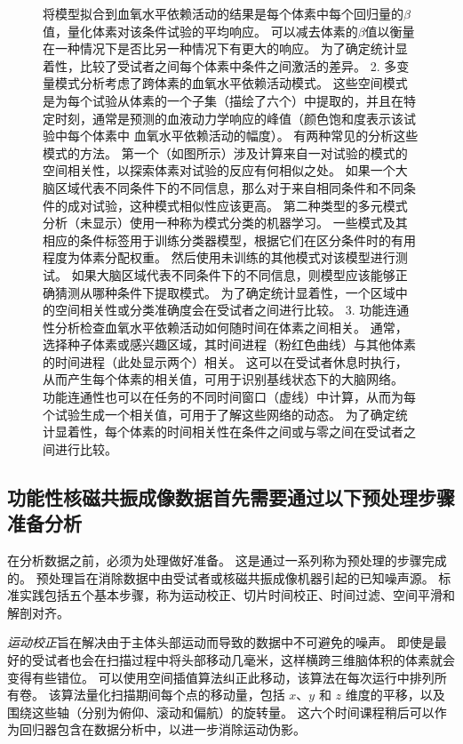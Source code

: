 \begin{figure}[htbp]
{		将模型拟合到血氧水平依赖活动的结果是每个体素中每个回归量的$\beta$值，量化体素对该条件试验的平均响应。 
		可以减去体素的$\beta$值以衡量在一种情况下是否比另一种情况下有更大的响应。
		为了确定统计显着性，比较了受试者之间每个体素中条件之间激活的差异。
		2. 多变量模式分析考虑了跨体素的血氧水平依赖活动模式。
		这些空间模式是为每个试验从体素的一个子集（描绘了六个）中提取的，并且在特定时刻，通常是预测的血液动力学响应的峰值（颜色饱和度表示该试验中每个体素中 血氧水平依赖活动的幅度）。
		有两种常见的分析这些模式的方法。
		第一个（如图所示）涉及计算来自一对试验的模式的空间相关性，以探索体素对试验的反应有何相似之处。
		如果一个大脑区域代表不同条件下的不同信息，那么对于来自相同条件和不同条件的成对试验，这种模式相似性应该更高。
		第二种类型的多元模式分析（未显示）使用一种称为模式分类的机器学习。
		一些模式及其相应的条件标签用于训练分类器模型，根据它们在区分条件时的有用程度为体素分配权重。
		然后使用未训练的其他模式对该模型进行测试。
		如果大脑区域代表不同条件下的不同信息，则模型应该能够正确猜测从哪种条件下提取模式。
		为了确定统计显着性，一个区域中的空间相关性或分类准确度会在受试者之间进行比较。
		3. 功能连通性分析检查血氧水平依赖活动如何随时间在体素之间相关。
		通常，选择种子体素或感兴趣区域，其时间进程（粉红色曲线）与其他体素的时间进程（此处显示两个）相关。
		这可以在受试者休息时执行，从而产生每个体素的相关值，可用于识别基线状态下的大脑网络。
		功能连通性也可以在任务的不同时间窗口（虚线）中计算，从而为每个试验生成一个相关值，可用于了解这些网络的动态。
		为了确定统计显着性，每个体素的时间相关性在条件之间或与零之间在受试者之间进行比较。}
	\label{fig:6_2}
\end{figure}




\subsection{功能性核磁共振成像数据首先需要通过以下预处理步骤准备分析}

在分析数据之前，必须为处理做好准备。 
这是通过一系列称为预处理的步骤完成的。 
预处理旨在消除数据中由受试者或核磁共振成像机器引起的已知噪声源。 
标准实践包括五个基本步骤，称为运动校正、切片时间校正、时间过滤、空间平滑和解剖对齐。


\textit{运动校正}旨在解决由于主体头部运动而导致的数据中不可避免的噪声。
即使是最好的受试者也会在扫描过程中将头部移动几毫米，这样横跨三维脑体积的体素就会变得有些错位。
可以使用空间插值算法纠正此移动，该算法在每次运行中排列所有卷。
该算法量化扫描期间每个点的移动量，包括 $x$、$y$ 和 $z$ 维度的平移，以及围绕这些轴（分别为俯仰、滚动和偏航）的旋转量。
这六个时间课程稍后可以作为回归器包含在数据分析中，以进一步消除运动伪影。


